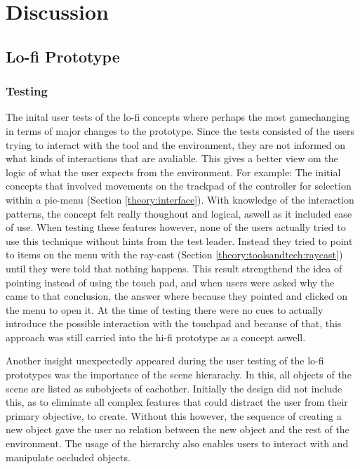 
\chapter{Discussion}
\section{Lo-fi Prototype}
\subsection{Testing}
The inital user tests of the lo-fi concepts where perhaps the most gamechanging in terms of major changes to the prototype. Since the tests consisted of the users trying to interact with the tool and the environment, they are not informed on what kinds of interactions that are avaliable. This gives a better view om the logic of what the user expects from the environment. For example: The initial concepts that involved movements on the trackpad of the controller for selection within a pie-menu (Section \ref{theory:interface}). With knowledge of the interaction patterns, the concept felt really thoughout and logical, aswell as it included ease of use. When testing these features however, none of the users actually tried to use this technique without hints from the test leader. Instead they tried to point to items on the menu with the ray-cast (Section \ref{theory:toolsandtech:raycast}) until they were told that nothing happens. This result strengthend the idea of pointing instead of using the touch pad, and when users were asked why the came to that conclusion, the answer where because they pointed and clicked on the menu to open it. At the time of testing there were no cues to actually introduce the possible interaction with the touchpad and because of that, this approach was still carried into the hi-fi prototype as a concept aswell.

Another insight unexpectedly appeared during the user testing of the lo-fi prototypes was the importance of the scene hierarachy. In this, all objects of the scene are listed as subobjects of eachother. Initially the design did not include this, as to eliminate all complex features that could distract the user from their primary objective, to create. Without this however, the sequence of creating a new object gave the user no relation between the new object and the rest of the environment. The usage of the hierarchy also enables users to interact with and manipulate occluded objects.

